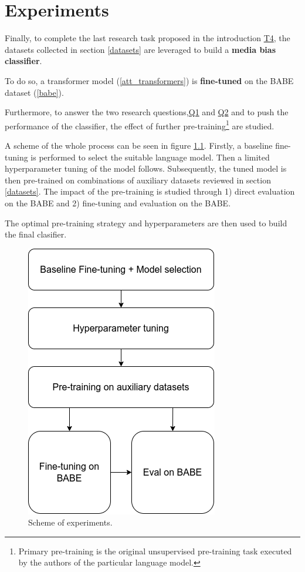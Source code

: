 \chapter{Experiments}\label{experiments}
Finally, to complete the last research task proposed in the introduction \hyperref[problem_definition]{T4}, the datasets collected in section \ref{datasets} are leveraged to build a \textbf{media bias classifier}.

To do so, a transformer model (\ref{att_transformers}) is \textbf{fine-tuned} on the BABE dataset (\ref{babe}).


Furthermore, to answer the two research questions,\hyperref[Q1]{Q1} and \hyperref[Q2]{Q2} and to push the performance of the classifier, the effect of further pre-training\footnote{Primary pre-training is the original unsupervised pre-training task executed by the authors of the particular language model.} are studied.

A scheme of the whole process can be seen in figure \ref{fig:pipeline}. Firstly, a baseline fine-tuning is performed to select the suitable language model. Then a limited hyperparameter tuning of the model follows. Subsequently, the tuned model is then pre-trained on combinations of auxiliary datasets reviewed in section \ref{datasets}. The impact of the pre-training is studied through 1) direct evaluation on the BABE and 2) fine-tuning and evaluation on the BABE.

The optimal pre-training strategy and hyperparameters are then used to build the final clasifier.
 
\begin{figure}[h]
  \includegraphics[scale=0.5]{my_modules/multimedia/pipeline.png}
  \caption{Scheme of experiments.}
  \label{fig:pipeline}
\end{figure}
 
